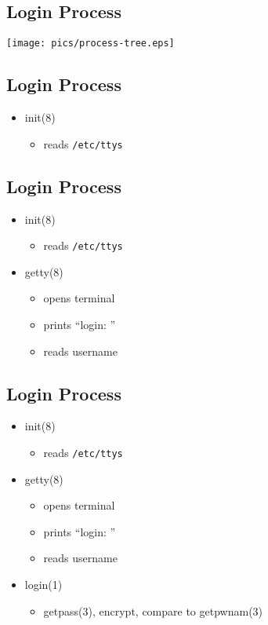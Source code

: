 \documentclass[xga]{xdvislides}
\begin{document}
\subsection{Login Process}
\begin{center}
\texttt{[image: pics/process-tree.eps]} \\
\end{center}



\subsection{Login Process}
\begin{itemize}
	\item init(8)
		\begin{itemize}
			\item reads {\tt /etc/ttys}
		\end{itemize}
\end{itemize}

\subsection{Login Process}
\begin{itemize}
	\item init(8)
		\begin{itemize}
			\item reads {\tt /etc/ttys}
		\end{itemize}
	\item getty(8)
		\begin{itemize}
			\item opens terminal
			\item prints ``login: ''
			\item reads username
		\end{itemize}
\end{itemize}

\subsection{Login Process}
\begin{itemize}
	\item init(8)
		\begin{itemize}
			\item reads {\tt /etc/ttys}
		\end{itemize}
	\item getty(8)
		\begin{itemize}
			\item opens terminal
			\item prints ``login: ''
			\item reads username
		\end{itemize}
	\item login(1)
		\begin{itemize}
			\item getpass(3), encrypt, compare to getpwnam(3)
		\end{itemize}
\end{itemize}
\end{document}

